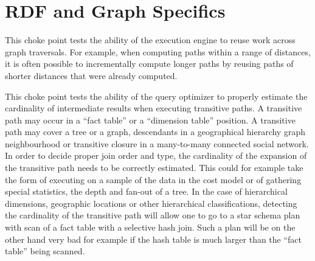


\section{RDF and Graph Specifics}



This choke point tests the ability of the execution engine to reuse work across
graph traversals. For example, when computing paths within a range of distances,
it is often possible to incrementally compute longer paths by reusing paths of
shorter distances that were already computed.





This choke point tests the ability of the query optimizer to properly estimate the cardinality of intermediate results when executing transitive paths. A transitive path may occur in a ``fact table'' or a ``dimension table'' position.
A transitive path may cover a tree or a graph, \eg descendants in a geographical hierarchy \vs graph neighbourhood or transitive closure in a many-to-many connected social network.
In order to decide proper join order and type, the cardinality of the expansion of the transitive path needs to be correctly estimated.
This could for example take the form of executing on a sample of the data in the
cost model or of gathering special statistics, \eg the depth and fan-out of a tree. In the case of hierarchical dimensions,
\eg geographic locations or other hierarchical classifications, detecting the cardinality of the transitive path will allow one to go to a star schema plan with scan of a fact table with a selective hash join.
Such a plan will be on the other hand very bad for example if the hash table is much larger than the ``fact table'' being scanned.



